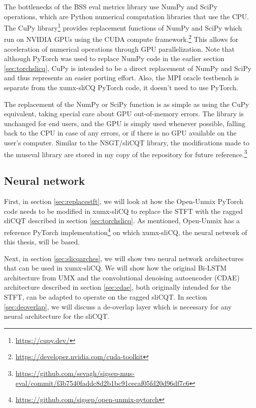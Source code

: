 \documentclass[report.tex]{subfiles}
\begin{document}
The bottlenecks of the BSS eval metrics library use NumPy and SciPy operations, which are Python numerical computation libraries that use the CPU. The CuPy library\footnote{\url{https://cupy.dev/}} provides replacement functions of NumPy and SciPy which run on NVIDIA GPUs using the CUDA compute framework.\footnote{\url{https://developer.nvidia.com/cuda-toolkit}} This allows for acceleration of numerical operations through GPU parallelization. Note that although PyTorch was used to replace NumPy code in the earlier section \ref{sec:torchslicq}, CuPy is intended to be a direct replacement of NumPy and SciPy and thus represents an easier porting effort. Also, the MPI oracle testbench is separate from the xumx-sliCQ PyTorch code, it doesn't need to use PyTorch.

The replacement of the NumPy or SciPy function is as simple as using the CuPy equivalent, taking special care about GPU out-of-memory errors. The library is unchanged for end users, and the GPU is simply used whenever possible, falling back to the CPU in case of any errors, or if there is no GPU available on the user's computer. Similar to the NSGT/sliCQT library, the modifications made to the museval library are stored in my copy of the repository for future reference.\footnote{\url{https://github.com/sevagh/sigsep-mus-eval/commit/f3b7540faddc8d2b1bc91cecaf05fd20d96df7c6}}

\newpagefill

\subsection{Neural network}
\label{sec:neuralnet}

First, in section \ref{sec:replacestft}, we will look at how the Open-Unmix PyTorch code needs to be modified in xumx-sliCQ to replace the STFT with the ragged sliCQT described in section \ref{sec:torchslicq}. As mentioned, Open-Unmix has a reference PyTorch implementation\footnote{\url{https://github.com/sigsep/open-unmix-pytorch}} on which xumx-sliCQ, the neural network of this thesis, will be based.

Next, in section \ref{sec:slicqarches}, we will show two neural network architectures that can be used in xumx-sliCQ. We will show how the original Bi-LSTM architecture from UMX and the convolutional denoising autoencoder (CDAE) architecture described in section \ref{sec:cdae}, both originally intended for the STFT, can be adapted to operate on the ragged sliCQT. In section \ref{sec:deoverlap}, we will discuss a de-overlap layer which is necessary for any neural architecture for the sliCQT.
\end{document}

